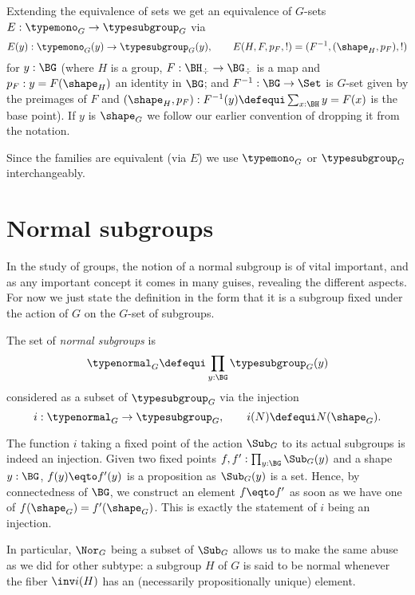 Extending the equivalence of sets we get an equivalence of $G$-sets $E:\typemono_G\to\typesubgroup_G$ via
$$E(y):\typemono_G(y)\to\typesubgroup_G(y),\qquad E(H,F,p_F,!)=(F^{-1}, (\shape_H,p_F),!)
$$
for $y:\BG$ (where $H$ is a group, $F:\BH_\div\to \BG_\div$ is a map and $p_F:y=F(\shape_H)$ an identity in $\BG$; and $F^{-1}:\BG\to\Set$ is $G$-set given by the preimages of $F$ and $(\shape_H,p_F):F^{-1}(y)\defequi \sum_{x:\BH}y=F(x)$ is the base point).  If $y$ is $\shape_G$ we follow our earlier convention of dropping it from the notation.


Since the families are equivalent (via $E$) we use $\typemono_G$ or $\typesubgroup_G$ interchangeably.

\section{Normal subgroups}
\label{sec:normal}
In the study of groups, the notion of a normal subgroup is of vital important, and as any important concept it comes in many guises, revealing the different aspects.
For now we just state the definition in the form that it is a subgroup fixed under the action of $G$ on the $G$-set of subgroups.

\begin{definition}
  \label{def:normalsubgroup}
  The set of \emph{normal subgroups} is
  $$\typenormal_G\defequi\prod_{y:\BG}\typesubgroup_G(y)$$
  considered as a subset of $\typesubgroup_G$ via the injection
  $$i:\typenormal_G\to\typesubgroup_G,\qquad i(N)\defequi N(\shape_G).$$
\end{definition}
\begin{remark}
  The function $i$ taking a fixed point of the action $\Sub_G$ to its actual
  subgroups is indeed an injection. Given two fixed points
  $f,f':\prod_{y:\BG} \Sub_G(y)$ and a shape $y:\BG$, $f(y) \eqto f'(y)$ is a
  proposition as $\Sub_G(y)$ is a set. Hence, by connectedness of $\BG$, we
  construct an element $f \eqto f'$ as soon as we have one of
  $f(\shape_G) = f'(\shape_G)$. This is exactly the statement of $i$ being an
  injection.

  In particular, $\Nor_G$ being a subset of $\Sub_G$ allows us to make the same
  abuse as we did for other subtype: a subgroup $H$ of $G$ is said to be normal
  whenever the fiber $\inv i (H)$ has an (necessarily propositionally unique)
  element.
\end{remark}



